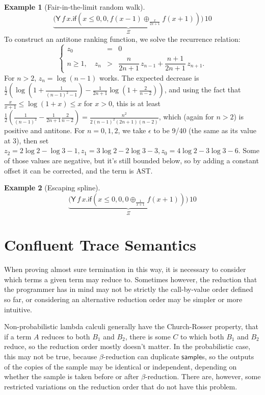 \documentclass{article}
\newcommand{\tY}{\mathsf{Y}}
\newcommand{\tif}[3]{\mathsf{if}(#1, #2, #3)} %
\newcommand{\tsample}{\mathsf{sample}}
\theoremstyle{definition}
\newtheorem{example}{Example}
\theoremstyle{lemma}
\theoremstyle{remark}
\begin{document}
\begin{example}[Fair-in-the-limit random walk]
\label{ex:Fair-in-the-limit random walk}\citep[\S 5.3]{DBLP:journals/pacmpl/McIverMKK18}
\[
\underbrace{\big
(\tY \, f \, x . 
\tif{x \leq 0}{0}{f(x - 1) \oplus_{\frac{x}{2x+1}} f(x + 1)} \big)}_{\Xi} 
\, 10
\]
To construct an antitone ranking function, we solve the recurrence relation:
\[
\left\{
\begin{array}{rll}
z_0 &=& 0\\
n \geq 1, \quad z_n &>& \dfrac{n}{2n + 1} \, z_{n-1} + \dfrac{n+1}{2n + 1} \, z_{n+1}.
\end{array}
\right.
\]
For $n > 2$, $z_n = \log(n-1)$ works. The expected decrease is $\frac 1 2(\log(1+\frac 1 {(n-1)^2-1}) - \frac 1 {2n+1} \log(1 + \frac 2 {n-2}))$, and using the fact that $\frac x {x+1} \leq \log (1+x) \leq x$ for $x > 0$, this is at least $\frac 1 2(\frac 1 {(n-1)^2} - \frac 1 {2n + 1} \frac 2 {n-2}) = \frac {n^2}{2(n-1)^2(2n+1)(n-2)}$, which (again for $n > 2$) is positive and antitone. For $n = 0, 1, 2$, we take $\epsilon$ to be 9/40 (the same as its value at 3), then set $z_2 = 2 \log 2 - \log 3 - 1, z_1 = 3 \log 2 - 2 \log 3 - 3, z_0 = 4 \log 2 - 3 \log 3 - 6$. Some of those values are negative, but it's still bounded below, so by adding a constant offset it can be corrected, and the term is AST.

\end{example}

\begin{example}[Escaping spline]
\label{ex:escaping spline}\citep[\S 5.4]{DBLP:journals/pacmpl/McIverMKK18}
\[
\underbrace{\big
(\tY \, f \, x . 
\tif{x \leq 0}{0}{0 \oplus_{\frac{1}{x+1}} f(x + 1)} \big)}_{\Xi} 
\, 10
\]
\end{example}





\section{Confluent Trace Semantics}
When proving almost sure termination in this way, it is necessary to consider which terms a given term may reduce to. Sometimes however, the reduction that the programmer has in mind may not be strictly the call-by-value order defined so far, or considering an alternative reduction order may be simpler or more intuitive.

Non-probabilistic lambda calculi generally have the Church-Rosser property, that if a term $A$ reduces to both $B_1$ and $B_2$, there is some $C$ 
to which both $B_1$ and $B_2$ reduce,
so the reduction order mostly doesn't matter. 
In the probabilistic case, this may not be true, because $\beta$-reduction can duplicate $\tsample$s, so the outputs of the copies of the sample may be identical or independent, depending on whether the sample is taken before or after $\beta$-reduction. 
There are, however, some restricted variations on the reduction order that do not have this problem.
\end{document}
